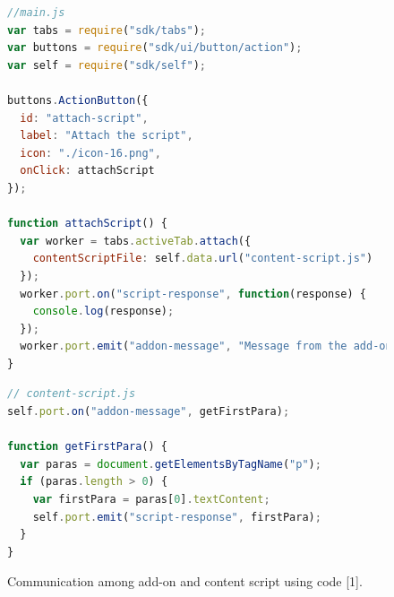 \begin{figure}[h]
  \centering

\begin{lstlisting}[language=JavaScript] 
//main.js
var tabs = require("sdk/tabs");
var buttons = require("sdk/ui/button/action");
var self = require("sdk/self");

buttons.ActionButton({
  id: "attach-script",
  label: "Attach the script",
  icon: "./icon-16.png",
  onClick: attachScript
});

function attachScript() {
  var worker = tabs.activeTab.attach({
    contentScriptFile: self.data.url("content-script.js")
  });
  worker.port.on("script-response", function(response) {
    console.log(response);
  });
  worker.port.emit("addon-message", "Message from the add-on");
}
\end{lstlisting}
\begin{lstlisting}[language=JavaScript] 
// content-script.js
self.port.on("addon-message", getFirstPara);

function getFirstPara() {
  var paras = document.getElementsByTagName("p");
  if (paras.length > 0) {
    var firstPara = paras[0].textContent;
    self.port.emit("script-response", firstPara);
  }
}
\end{lstlisting}
    \caption[Communication among add-on and content script using code]{Communication among add-on and content script using code [1].}
    \label{fig:communication}
\end{figure}

